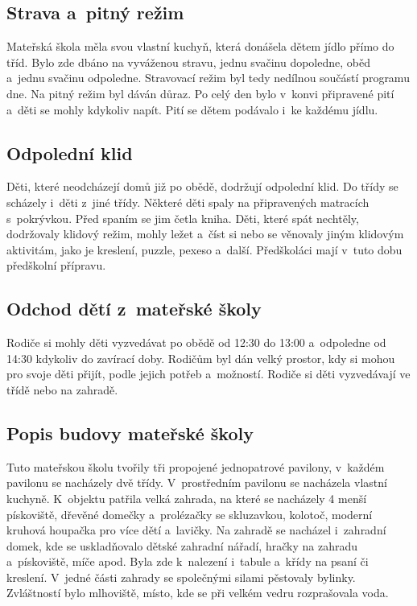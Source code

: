 		\subsection{Strava a~pitný režim}
			Mateřská škola měla svou vlastní kuchyň, která donášela dětem jídlo přímo do tříd. Bylo zde dbáno na vyváženou stravu, jednu svačinu dopoledne, oběd a~jednu svačinu odpoledne. Stravovací režim byl tedy nedílnou součástí programu dne. Na pitný režim byl dáván důraz. Po celý den bylo v~konvi připravené pití a~děti se mohly kdykoliv napít. Pití se dětem podávalo i~ke každému jídlu.

		\subsection{Odpolední klid}
			Děti, které neodcházejí domů již po obědě, dodržují odpolední klid. Do třídy se scházely i~děti z~jiné třídy. Některé děti spaly na připravených matracích s~pokrývkou. Před spaním se jim četla kniha. Děti, které spát nechtěly, dodržovaly klidový režim, mohly ležet a~číst si nebo se věnovaly jiným klidovým aktivitám, jako je kreslení, puzzle, pexeso a~další. Předškoláci mají v tuto dobu předškolní přípravu. 


		\subsection{Odchod dětí z~mateřské školy}
			Rodiče si mohly děti vyzvedávat po obědě od 12:30 do 13:00 a~odpoledne od 14:30 kdykoliv do zavírací doby. Rodičům byl dán velký prostor, kdy si mohou pro svoje děti přijít, podle jejich potřeb a~možností. Rodiče si děti vyzvedávají ve třídě nebo na zahradě. 

		\subsection{Popis budovy mateřské školy}

			Tuto mateřskou školu tvořily tři propojené jednopatrové pavilony, v~každém pavilonu se nacházely dvě třídy. V~prostředním pavilonu se nacházela vlastní kuchyně. K~objektu patřila velká zahrada, na které se nacházely 4 menší pískoviště, dřevěné domečky a~prolézačky se skluzavkou, kolotoč, moderní kruhová houpačka pro více dětí a~lavičky. Na zahradě se nacházel i~zahradní domek, kde se uskladňovalo dětské zahradní nářadí, hračky na zahradu a~pískoviště, míče apod. Byla zde k~nalezení i~tabule a~křídy na psaní či kreslení. V~jedné části zahrady se společnými silami pěstovaly bylinky. Zvláštností bylo mlhoviště, místo, kde se při velkém vedru rozprašovala voda. 

